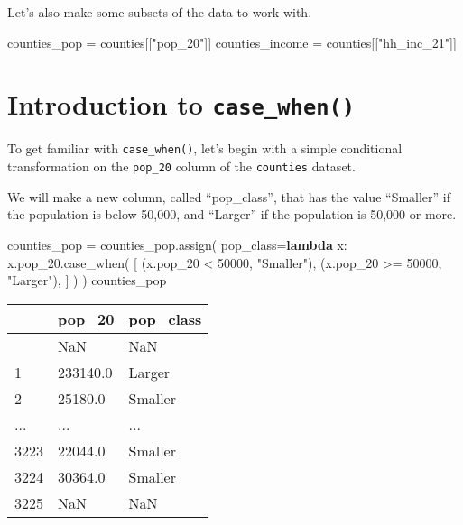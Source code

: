 \documentclass[
  letterpaper,
  DIV=11,
  numbers=noendperiod]{scrreprt}
\newenvironment{Shaded}{\begin{snugshade}}{\end{snugshade}}
\newcommand{\DecValTok}[1]{\textcolor[rgb]{0.68,0.00,0.00}{#1}}
\newcommand{\KeywordTok}[1]{\textcolor[rgb]{0.00,0.23,0.31}{\textbf{#1}}}
\newcommand{\NormalTok}[1]{\textcolor[rgb]{0.00,0.23,0.31}{#1}}
\newcommand{\OperatorTok}[1]{\textcolor[rgb]{0.37,0.37,0.37}{#1}}
\newcommand{\StringTok}[1]{\textcolor[rgb]{0.13,0.47,0.30}{#1}}
\begin{document}
Let's also make some subsets of the data to work with.

\begin{Shaded}
\begin{Highlighting}[]
\NormalTok{counties\_pop }\OperatorTok{=}\NormalTok{ counties[[}\StringTok{"pop\_20"}\NormalTok{]]}
\NormalTok{counties\_income }\OperatorTok{=}\NormalTok{ counties[[}\StringTok{"hh\_inc\_21"}\NormalTok{]]}
\end{Highlighting}
\end{Shaded}

\section{\texorpdfstring{Introduction to
\texttt{case\_when()}}{Introduction to case\_when()}}\label{introduction-to-case_when}

To get familiar with \texttt{case\_when()}, let's begin with a simple
conditional transformation on the \texttt{pop\_20} column of the
\texttt{counties} dataset.

We will make a new column, called ``pop\_class'', that has the value
``Smaller'' if the population is below 50,000, and ``Larger'' if the
population is 50,000 or more.

\begin{Shaded}
\begin{Highlighting}[]
\NormalTok{counties\_pop }\OperatorTok{=}\NormalTok{ counties\_pop.assign(}
\NormalTok{    pop\_class}\OperatorTok{=}\KeywordTok{lambda}\NormalTok{ x: x.pop\_20.case\_when(}
\NormalTok{        [}
\NormalTok{            (x.pop\_20 }\OperatorTok{\textless{}} \DecValTok{50000}\NormalTok{, }\StringTok{"Smaller"}\NormalTok{),}
\NormalTok{            (x.pop\_20 }\OperatorTok{\textgreater{}=} \DecValTok{50000}\NormalTok{, }\StringTok{"Larger"}\NormalTok{),}
\NormalTok{        ]}
\NormalTok{    )}
\NormalTok{)}
\NormalTok{counties\_pop}
\end{Highlighting}
\end{Shaded}

\begin{longtable}[]{@{}lll@{}}
\toprule\noalign{}
& pop\_20 & pop\_class \\
\midrule\noalign{}
\endhead
\bottomrule\noalign{}
\endlastfoot
0 & NaN & NaN \\
1 & 233140.0 & Larger \\
2 & 25180.0 & Smaller \\
... & ... & ... \\
3223 & 22044.0 & Smaller \\
3224 & 30364.0 & Smaller \\
3225 & NaN & NaN \\
\end{longtable}
\end{document}
